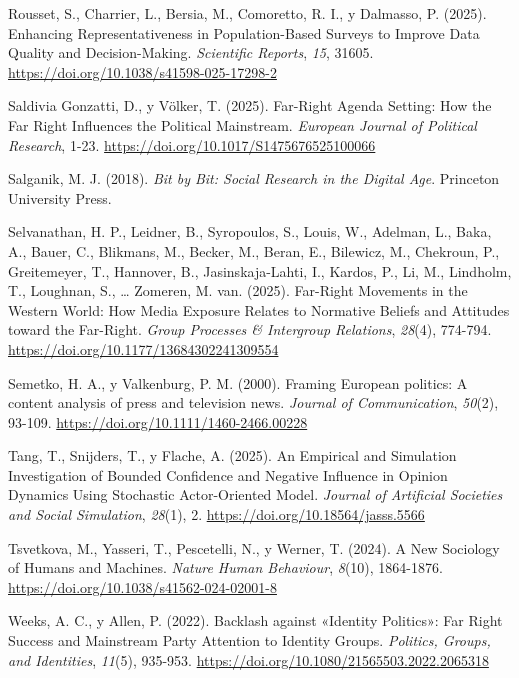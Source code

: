 \documentclass[
  letterpaper,
  numbers=noendperiod,
  fontsize=11pt,
  DIV=12,
  titlepage=false]{scrreprt}
\newlength{\cslhangindent}
\newenvironment{CSLReferences}[2] %
 {\begin{list}{}{%
  \setlength{\itemindent}{0pt}
  \setlength{\leftmargin}{0pt}
  \setlength{\parsep}{0pt}
  \ifodd #1
   \setlength{\leftmargin}{\cslhangindent}
   \setlength{\itemindent}{-1\cslhangindent}
  \fi
  \setlength{\itemsep}{#2\baselineskip}}}
 {\end{list}}
\begin{document}
\begin{CSLReferences}{1}{0}
Rousset, S., Charrier, L., Bersia, M., Comoretto, R. I., y Dalmasso, P.
(2025). Enhancing Representativeness in Population-Based Surveys to
Improve Data Quality and Decision-Making. \emph{Scientific Reports},
\emph{15}, 31605. \url{https://doi.org/10.1038/s41598-025-17298-2}

Saldivia Gonzatti, D., y Völker, T. (2025). Far-Right Agenda Setting:
{How} the Far Right Influences the Political Mainstream. \emph{European
Journal of Political Research}, 1-23.
\url{https://doi.org/10.1017/S1475676525100066}

Salganik, M. J. (2018). \emph{Bit by Bit: Social Research in the Digital
Age}. Princeton University Press.

Selvanathan, H. P., Leidner, B., Syropoulos, S., Louis, W., Adelman, L.,
Baka, A., Bauer, C., Blikmans, M., Becker, M., Beran, E., Bilewicz, M.,
Chekroun, P., Greitemeyer, T., Hannover, B., Jasinskaja-Lahti, I.,
Kardos, P., Li, M., Lindholm, T., Loughnan, S., \ldots{} Zomeren, M.
van. (2025). Far-Right Movements in the {Western World}: How Media
Exposure Relates to Normative Beliefs and Attitudes toward the
Far-Right. \emph{Group Processes \& Intergroup Relations}, \emph{28}(4),
774-794. \url{https://doi.org/10.1177/13684302241309554}

Semetko, H. A., y Valkenburg, P. M. (2000). Framing {European} politics:
{A} content analysis of press and television news. \emph{Journal of
Communication}, \emph{50}(2), 93-109.
\url{https://doi.org/10.1111/1460-2466.00228}

Tang, T., Snijders, T., y Flache, A. (2025). An {Empirical} and
{Simulation Investigation} of {Bounded Confidence} and {Negative
Influence} in {Opinion Dynamics Using Stochastic Actor-Oriented Model}.
\emph{Journal of Artificial Societies and Social Simulation},
\emph{28}(1), 2. \url{https://doi.org/10.18564/jasss.5566}

Tsvetkova, M., Yasseri, T., Pescetelli, N., y Werner, T. (2024). A New
Sociology of Humans and Machines. \emph{Nature Human Behaviour},
\emph{8}(10), 1864-1876.
\url{https://doi.org/10.1038/s41562-024-02001-8}

Weeks, A. C., y Allen, P. (2022). Backlash against {«Identity
Politics»}: Far Right Success and Mainstream Party Attention to Identity
Groups. \emph{Politics, Groups, and Identities}, \emph{11}(5), 935-953.
\url{https://doi.org/10.1080/21565503.2022.2065318}

\end{CSLReferences}

\nocite{*}
\end{document}
